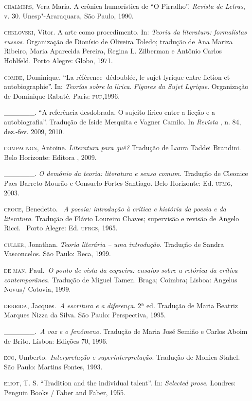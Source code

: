 \begin{Parskip}
\textsc{chalmers}, Vera Maria. A crônica humorística de ``O Pirralho''.
\emph{Revista de Letras}, v. 30. Unesp"-Araraquara, São Paulo, 1990.

\textsc{chklovski}, Vitor. A arte como procedimento. In: \emph{Teoria da
literatura: formalistas russos}. Organização de Dionísio de Oliveira
Toledo; tradução de Ana Mariza Ribeiro, Maria Aparecida Pereira, Regina
L. Zilberman e Antônio Carlos Hohlfeld. Porto Alegre: Globo, 1971.

\textsc{combe}, Dominique. ``La référence~dédoublée, le sujet lyrique
entre fiction et autobiographie''. In: \emph{Teorías sobre la lírica}.
\emph{Figures du Sujet Lyrique}. Organização de Dominique Rabaté. Paris:
\textsc{puf},1996.

\_\_\_\_\_\_. ``A referência desdobrada. O sujeito lírico entre a ficção
e a autobiografia''. Tradução de Iside Mesquita e Vagner Camilo. In
\emph{Revista }, n. 84, dez.-fev. 2009, 2010.

\textsc{compagnon}, Antoine. \emph{Literatura para quê?} Tradução de
Laura Taddei Brandini. Belo Horizonte: Editora , 2009.

\_\_\_\_\_\_. \emph{O demônio da teoria: literatura e senso comum.}
Tradução de Cleonice Paes Barreto Mourão e Consuelo Fortes Santiago.
Belo Horizonte: Ed. \textsc{ufmg}, 2003.

\textsc{croce}, Benedetto. \emph{~A poesia: introdução à crítica e
história da poesia e da literatura}. Tradução de Flávio Loureiro
Chaves; supervisão e revisão de Angelo Ricci. ~Porto Alegre: Ed.
\textsc{ufrgs}, 1965.

\textsc{culler}, Jonathan. \emph{Teoria literária -- uma introdução.}
Tradução de Sandra Vasconcelos. São Paulo: Beca, 1999.

\textsc{de man}, Paul.~\emph{O ponto de vista da cegueira: ensaios
sobre a retórica da crítica contemporânea.} Tradução de Miguel Tamen.
Braga; Coimbra; Lisboa: Angelus Novus/ Cotovia, 1999.

\textsc{derrida}, Jacques.~\emph{A escritura e a diferença}. 2ª ed.
Tradução de Maria Beatriz Marques Nizza da Silva. São Paulo:
Perspectiva, 1995.

\_\_\_\_\_\_.~\emph{A voz e o fenómeno}. Tradução de Maria José Semião e
Carlos Aboim de Brito. Lisboa: Edições 70, 1996.

\textsc{eco}, Umberto.~\emph{Interpretação e superinterpretação}.
Tradução de Monica Stahel. São Paulo: Martins Fontes, 1993.

\textsc{eliot}, T. S. ``Tradition and the individual talent''. In:
\emph{Selected prose}. Londres: Penguin Books / Faber and Faber, 1955.


\end{Parskip}
